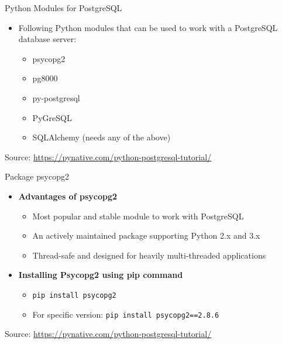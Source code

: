 \documentclass[aspectratio=169, xcolor=dvipsnames]{beamer}
\begin{document}
\begin{frame}{Python Modules for PostgreSQL}
    \begin{itemize}[<+->]
        \item Following Python modules that can be used to work with a PostgreSQL database server:
        \begin{itemize}
            \item[$\triangleright$] psycopg2
            \item[$\triangleright$] pg8000
            \item[$\triangleright$] py-postgresql
            \item[$\triangleright$] PyGreSQL
            \item[$\triangleright$] SQLAlchemy (needs any of the above)
        \end{itemize}
    \end{itemize}
    \vspace{1em}
    \small Source: \url{https://pynative.com/python-postgresql-tutorial/}
\end{frame}

\begin{frame}{Package psycopg2}
    \begin{itemize}[<+->]
        \item \textbf{Advantages of psycopg2}
        \begin{itemize}
            \item[$\triangleright$] Most popular and stable module to work with PostgreSQL
            \item[$\triangleright$] An actively maintained package supporting Python 2.x and 3.x
            \item[$\triangleright$] Thread-safe and designed for heavily multi-threaded applications
        \end{itemize}
        \item \textbf{Installing Psycopg2 using pip command}
        \begin{itemize}
            \item[$\triangleright$] \texttt{pip install psycopg2}
            \item[$\triangleright$] For specific version: \texttt{pip install psycopg2==2.8.6}
        \end{itemize}
    \end{itemize}
    \vspace{1em}
    \small Source: \url{https://pynative.com/python-postgresql-tutorial/}
\end{frame}
\end{document}
